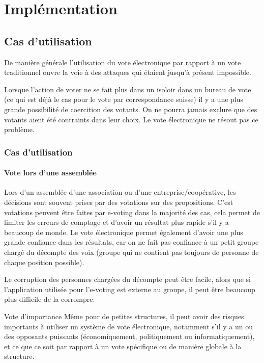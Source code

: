 \documentclass[../report]{subfiles}
\begin{document}
\part{Implémentation}

\chapter{Cas d'utilisation}\label{chap:usecase}

De manière générale l'utilisation du vote électronique par rapport à un vote traditionnel ouvre la voie à 
des attaques qui étaient jusqu'à présent impossible. 

Lorsque l'action de voter ne se fait plus dans un isoloir dans un bureau de vote (ce qui est déjà le cas
pour le vote par correspondance suisse) il y a une plus grande possibilité de coercition des votants.
On ne pourra jamais exclure que des votants aient été contraints dans leur choix. 
Le vote électronique ne résout pas ce problème.

\section{Cas d'utilisation}
\subsection{Vote lors d'une assemblée}

Lors d'un assemblée d'une association ou d'une entreprise/coopérative, les décisions sont souvent prises par
des votations sur des propositions.
C'est votations peuvent être faites par e-voting dans la majorité des cas, cela permet de limiter les erreurs 
de comptage et d'avoir un résultat plus rapide s'il y a beaucoup de monde.
Le vote électronique permet également d'avoir une plus grande confiance dans les résultats, car on ne fait pas 
confiance à un petit groupe chargé du décompte des voix (groupe qui ne contient pas toujours de personne de 
chaque position possible).

Le corruption des personnes chargées du décompte peut être facile, alors que si l'application utilisée pour
l'e-voting est externe au groupe, il peut être beaucoup plus difficile de la corrompre.

\begin{important}{Vote d'importance}
	Même pour de petites structures, il peut avoir des risques importants à utiliser un système de vote électronique, 
	notamment s'il y a un ou des opposants puissants (économiquement, politiquement ou informatiquement), et ce que
	ce soit par rapport à un vote spécifique ou de manière globale à la structure.
\end{important}
\end{document}

